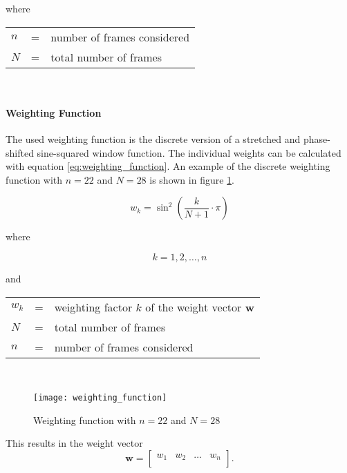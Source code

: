 where

\begin{tabular}{lll}
  $n$ & = & number of frames considered \\
  $N$ & = & total number of frames \\
\end{tabular}
\\

\paragraph{Weighting Function}
The used weighting function is the discrete version of a stretched and phase-shifted sine-squared window function.
The individual weights can be calculated with equation \ref{eq:weighting_function}.
An example of the discrete weighting function with $n = 22$ and $N = 28$ is shown in figure \ref{fig:weighting_function}.

\begin{equation}
  w_k = \sin^2\left(\frac{k}{N+1} \cdot \pi \right)
  \label{eq:weighting_function}
\end{equation}

where

\[
  k = 1, 2, \dots, n
\]

and

\begin{tabular}{lll}
  $w_k$ & = & weighting factor $k$ of the weight vector $\boldsymbol{w}$ \\
  $N$ & = & total number of frames \\
  $n$ & = & number of frames considered \\
\end{tabular}
\\

\begin{figure}
  \centering
  \texttt{[image: weighting\_function]}
  \caption{Weighting function with $n = 22$ and $N = 28$}
  \label{fig:weighting_function}
\end{figure}

This results in the weight vector
\begin{equation}
  \boldsymbol{w} =
  \begin{bmatrix}
    w_{1} & w_{2} & \dots & w_{n} \\
  \end{bmatrix}.
  \label{eq:weight_vector}
\end{equation}

